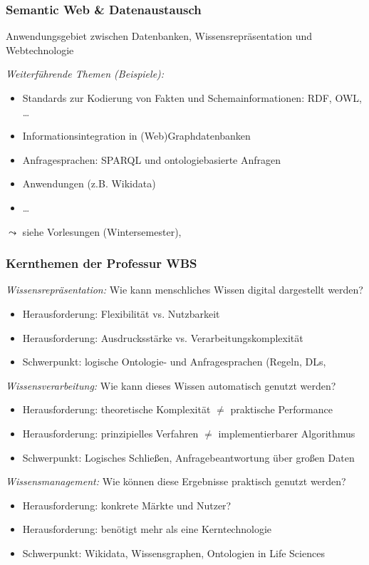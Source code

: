 \documentclass[aspectratio=1610,onlymath]{beamer}
\begin{document}
\begin{frame}\frametitle{Semantic Web \& Datenaustausch}

Anwendungsgebiet zwischen Datenbanken, Wissensrepräsentation und Webtechnologie
\bigskip

\emph{Weiterführende Themen (Beispiele):}
\begin{itemize}
\item Standards zur Kodierung von Fakten und Schemainformationen: RDF, OWL, \ldots
\item Informationsintegration in (Web)Graphdatenbanken
\item Anfragesprachen: SPARQL und ontologiebasierte Anfragen
\item Anwendungen (z.B. Wikidata)
\item \ldots
\end{itemize}

$\leadsto$ siehe Vorlesungen  (Wintersemester), 

\end{frame}


\begin{frame}\frametitle{Kernthemen der Professur WBS}\pause

\emph{Wissensrepräsentation:} \alert{Wie kann menschliches Wissen digital dargestellt werden?}
\begin{itemize}
\item Herausforderung: Flexibilität vs. Nutzbarkeit
\item Herausforderung: Ausdrucksstärke vs. Verarbeitungskomplexität
\item Schwerpunkt: logische Ontologie- und Anfragesprachen (Regeln, DLs, 
\end{itemize}\medskip\pause

\emph{Wissensverarbeitung:} \alert{Wie kann dieses Wissen automatisch genutzt werden?}
\begin{itemize}
\item Herausforderung: theoretische Komplexität $\neq$ praktische Performance
\item Herausforderung: prinzipielles Verfahren $\neq$ implementierbarer Algorithmus
\item Schwerpunkt: Logisches Schließen, Anfragebeantwortung über großen Daten
\end{itemize}\medskip\pause

\emph{Wissensmanagement:} \alert{Wie können diese Ergebnisse praktisch genutzt werden?}
\begin{itemize}
\item Herausforderung: konkrete Märkte und Nutzer?
\item Herausforderung: benötigt mehr als eine Kerntechnologie
\item Schwerpunkt: Wikidata, Wissensgraphen, Ontologien in Life Sciences
\end{itemize}

\end{frame}
\end{document}
